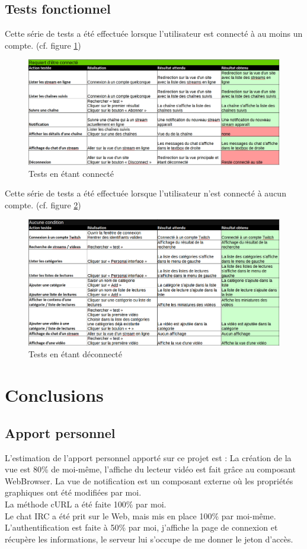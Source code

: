 \documentclass[11pt]{report} %
\begin{document}
	\section{Tests fonctionnel}
	Cette série de tests a été effectuée lorsque l'utilisateur est connecté à au moins un compte. (cf. figure \ref{tests connect})
	\begin{figure}[h]
		\center
		\includegraphics[width=1\textwidth]{../img/TestsConnect.png}
		\caption{Tests en étant connecté}
		\label{tests connect}
	\end{figure}
	
	Cette série de tests a été effectuée lorsque l'utilisateur n'est connecté à aucun compte. (cf. figure \ref{tests disconnect})
	\begin{figure}[h]
		\center
		\includegraphics[width=1\textwidth]{../img/TestsDisconnect.png}
		\caption{Tests en étant déconnecté}
		\label{tests disconnect}
	\end{figure}
	
\chapter{Conclusions}
\section{Apport personnel}
	L'estimation de l'apport personnel apporté sur ce projet est :
	La création de la vue est 80\% de moi-même, l'affiche du lecteur vidéo est fait grâce au composant WebBrowser. La vue de notification est un composant externe où les propriétés graphiques ont été modifiées par moi.\\
	La méthode cURL a été faite 100\% par moi.\\
	Le chat IRC a été prit sur le Web, mais mis en place 100\% par moi-même.\\
	L'authentification est faite à 50\% par moi, j'affiche la page de connexion et récupère les informations, le serveur lui s'occupe de me donner le jeton d'accès. 
\end{document}
